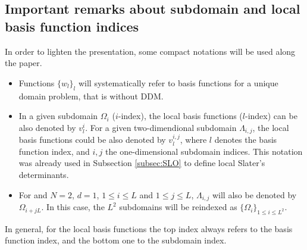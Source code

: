 \documentclass[11pt]{elsarticle}
\let \leq \leqslant
\begin{document}
\subsection{Important remarks about subdomain and local basis function indices}\label{notations}
In order to lighten the presentation, some compact notations will be used along the paper. 
\begin{itemize}
\item Functions $\{w_l\}_l$ will systematically refer to basis functions for a unique domain problem, that is without DDM.
\item  In a given subdomain $\Omega_i$ ($i$-index), the local basis functions ($l$-index) can be also denoted by $v_l^i$. For a given two-dimendional subdomain $\Lambda_{i,j}$, the local basis functions could be also denoted by $v^{i,j}_{l}$, where $l$ denotes the basis function index, and $i,j$ the one-dimensional subdomain indices. This notation was already used in Subsection \ref{subsec:SLO} to define local Slater's determinants.
\item  For and $N=2$, $d=1$, $1\leq i\leq L$ and $1\leq j \leq L$, $\Lambda_{i,j}$ will also be denoted by $\Omega_{i+jL}$. In this case, the $L^2$ subdomains will be reindexed as $\{\Omega_i\}_{1\leq i \leq L^2}$.
\end{itemize}
In general, for the local basis functions the top index always refers to the basis function index, and the bottom one to the subdomain index.
%


\newpage
%





\end{document}
